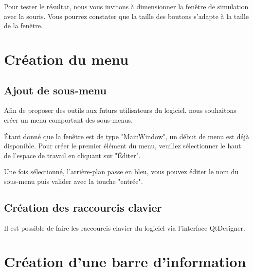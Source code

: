 Pour tester le résultat, nous vous invitons à dimensionner la fenêtre de simulation avec la souris. Vous pourrez constater que la taille des boutons s'adapte à la taille de la fenêtre.





\section{Création du menu}

\subsection{Ajout de sous-menu}

Afin de proposer des outils aux futurs utilisateurs du logiciel, nous souhaitons créer un menu comportant des sous-menus.




Étant donné que la fenêtre est de type "MainWindow", un début de menu est déjà disponible. Pour créer le premier élément du menu, veuillez sélectionner le haut de l'espace de travail en cliquant sur "Éditer". \newline



Une fois sélectionné, l'arrière-plan passe en bleu, vous pouvez éditer le nom du sous-menu puis valider avec la touche "entrée".

\subsection{Création des raccourcis clavier}

Il est possible de faire les raccourcis clavier du logiciel via l'interface QtDesigner. 


\section{Création d'une barre d'information}

